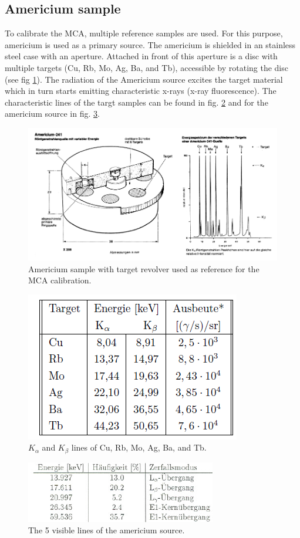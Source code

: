 \subsection{Americium sample}
To calibrate the MCA, multiple reference samples are used. For this purpose, americium is used as a primary source. The americium is shielded in an stainless steel case with an aperture. Attached in front of this aperture is a disc with multiple targets (Cu, Rb, Mo, Ag, Ba, and Tb), accessible by rotating the disc (see fig \ref{fig:Americium}). The radiation of the Americium source excites the target material which in turn starts emitting characteristic x-rays (x-ray fluorescence)\cite{landgraf}. The characteristic lines of the targt samples can be found in fig. \ref{fig:Americium_table} and for the americium source in fig. \ref{fig:Amercium_lines}.
\begin{figure}[h]
\centering
\includegraphics[width=0.7\linewidth]{graphics/Americium}
\caption[Americium sample]{Americium sample with target revolver used as  reference for the MCA calibration. \cite{anleitung}}
\label{fig:Americium}
\end{figure}
\begin{figure}[H]
\centering
\includegraphics[height=0.2\textheight]{graphics/Americium_table}
\caption[Line data for the calibration samples]{$K_\alpha$ and $K_\beta$ lines of Cu, Rb, Mo, Ag, Ba, and Tb. \cite{anleitung}}
\label{fig:Americium_table}
\end{figure}
\begin{figure}[H]
\centering
\includegraphics[height=0.2\textheight]{graphics/Amercium_lines}
\caption[5 visible Americium lines]{The 5 visible lines of the americium source. \cite{landgraf}}
\label{fig:Amercium_lines}
\end{figure}

